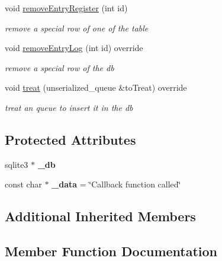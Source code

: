 \begin{DoxyCompactItemize}
void \hyperlink{classspider_1_1_sqlite_a3e869993d86dc5501fe66cc5d2b05c04}{remove\+Entry\+Register} (int id)
\begin{DoxyCompactList}\small\item\em remove a special row of one of the table \end{DoxyCompactList}\item 
void \hyperlink{classspider_1_1_sqlite_a62ae99de93b05a3c3282ac42fbc13468}{remove\+Entry\+Log} (int id) override
\begin{DoxyCompactList}\small\item\em remove a special row of the db \end{DoxyCompactList}\item 
void \hyperlink{classspider_1_1_sqlite_a3f2bc8e3e6eae99b7e2d4e9d9f6e0e94}{treat} (unserialized\+\_\+queue \&to\+Treat) override
\begin{DoxyCompactList}\small\item\em treat an queue to insert it in the db \end{DoxyCompactList}\end{DoxyCompactItemize}
\subsection*{Protected Attributes}
\begin{DoxyCompactItemize}
\item 
\mbox{\label{classspider_1_1_sqlite_aae89cf6ad184fba639517a1283ab7153}} 
sqlite3 $\ast$ {\bfseries \+\_\+db}
\item 
\mbox{\label{classspider_1_1_sqlite_a8e0836cf34db584e06d941c025370aaf}} 
const char $\ast$ {\bfseries \+\_\+data} = \char`\"{}Callback function called\char`\"{}
\end{DoxyCompactItemize}
\subsection*{Additional Inherited Members}


\subsection{Member Function Documentation}
\mbox{\label{classspider_1_1_sqlite_ae8ebd53fa6e30b8c8cfb463cc4e28cb8}} 
